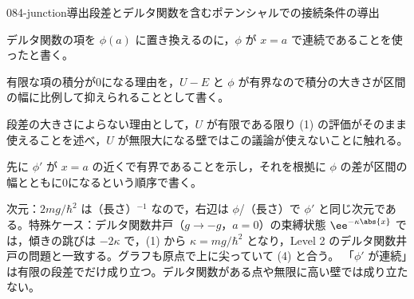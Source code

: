 \documentclass[uplatex,dvipdfmx,a4paper,11pt]{jsarticle}
\begin{document}
\begin{mondai}{084-junction}{導出}{段差とデルタ関数を含むポテンシャルでの接続条件の導出}
\begin{tadashii}
\begin{ronten}
  \item {} デルタ関数の項を $\phi(a)$ に置き換えるのに，$\phi$ が $x=a$ で連続であることを使ったと書く。
  \item {} 有限な項の積分が0になる理由を，$U-E$ と $\phi$ が有界なので積分の大きさが区間の幅に比例して抑えられることとして書く。
  \item {} 段差の大きさによらない理由として，$U$ が有限である限り (1) の評価がそのまま使えることを述べ，$U$ が無限大になる壁ではこの議論が使えないことに触れる。
  \item {} 先に $\phi'$ が $x=a$ の近くで有界であることを示し，それを根拠に $\phi$ の差が区間の幅とともに0になるという順序で書く。
\end{ronten}
\kenzan 次元：$2mg/\hbar^{2}$ は（長さ）$^{-1}$ なので，右辺は $\phi$/（長さ）で $\phi'$ と同じ次元である。特殊ケース：デルタ関数井戸（$g\to-g$，$a=0$）の束縛状態 $\ee^{-\kappa\abs{x}}$ では，傾きの跳びは $-2\kappa$ で，(1) から $\kappa=mg/\hbar^{2}$ となり，Level 2 のデルタ関数井戸の問題と一致する。グラフも原点で上に尖っていて (4) と合う。
\tsumazuki 「$\phi'$ が連続」は有限の段差でだけ成り立つ。デルタ関数がある点や無限に高い壁では成り立たない。
\end{tadashii}
\end{mondai}
\end{document}
